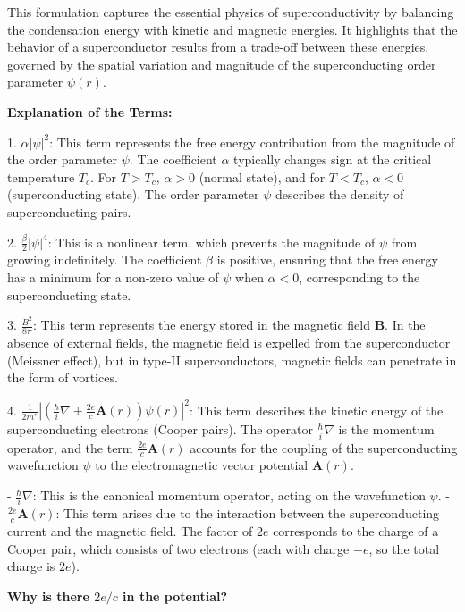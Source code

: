\documentclass{article}
\begin{document}
This formulation captures the essential physics of superconductivity by balancing the condensation energy with kinetic and magnetic energies. It highlights that the behavior of a superconductor results from a trade-off between these energies, governed by the spatial variation and magnitude of the superconducting order parameter \(\psi(r)\). 

\begin{theorem}
\textbf{Explanation of the Terms:}

1. \(\alpha |\psi|^2\):
   This term represents the free energy contribution from the magnitude of the order parameter \(\psi\). The coefficient \(\alpha\) typically changes sign at the critical temperature \(T_c\). For \(T > T_c\), \(\alpha > 0\) (normal state), and for \(T < T_c\), \(\alpha < 0\) (superconducting state). The order parameter \(\psi\) describes the density of superconducting pairs.

2. \(\frac{\beta}{2} |\psi|^4\): 
   This is a nonlinear term, which prevents the magnitude of \(\psi\) from growing indefinitely. The coefficient \(\beta\) is positive, ensuring that the free energy has a minimum for a non-zero value of \(\psi\) when \(\alpha < 0\), corresponding to the superconducting state.

3. \(\frac{B^2}{8\pi}\):
   This term represents the energy stored in the magnetic field \(\mathbf{B}\). In the absence of external fields, the magnetic field is expelled from the superconductor (Meissner effect), but in type-II superconductors, magnetic fields can penetrate in the form of vortices.

4. \(\frac{1}{2m^*} \left| \left( \frac{\hbar}{i} \nabla + \frac{2e}{c} \mathbf{A}(r) \right) \psi(r) \right|^2\): 
   This term describes the kinetic energy of the superconducting electrons (Cooper pairs). The operator \(\frac{\hbar}{i} \nabla\) is the momentum operator, and the term \(\frac{2e}{c} \mathbf{A}(r)\) accounts for the coupling of the superconducting wavefunction \(\psi\) to the electromagnetic vector potential \(\mathbf{A}(r)\).

   - \(\frac{\hbar}{i} \nabla\): This is the canonical momentum operator, acting on the wavefunction \(\psi\).
   - \(\frac{2e}{c} \mathbf{A}(r)\): This term arises due to the interaction between the superconducting current and the magnetic field. The factor of \(2e\) corresponds to the charge of a Cooper pair, which consists of two electrons (each with charge \(-e\), so the total charge is \(2e\)).

   \textbf{ Why is there \(2e/c\) in the potential?}


\end{theorem}
\end{document}
